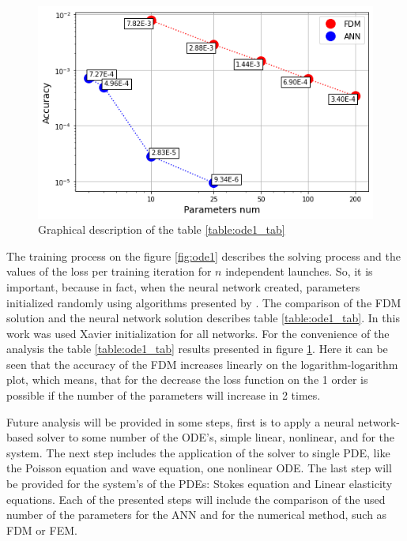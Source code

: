 \begin{figure}
	\centering
	\includegraphics[width=\textwidth]{images/chapter2/fdm_ann_ode_1.png}
	\caption{Graphical description of the table \ref{table:ode1_tab}}
	\label{fig:fdm_ann_ode1}
\end{figure}

The training process on the figure \ref{fig:ode1} describes the solving process and the values of the loss per training iteration for $n$ independent launches. So, it is important, because in fact, when the neural network created, parameters initialized randomly using algorithms presented by \cite{glorot2010understanding} \cite{he2015delving} \cite{saxe2013exact}. 
The comparison of the FDM solution and the neural network solution describes table \ref{table:ode1_tab}. In this work was used Xavier initialization for all networks. For the convenience of the analysis the table \ref{table:ode1_tab} results presented in figure \ref{fig:fdm_ann_ode1}. Here it can be seen that the accuracy of the FDM increases linearly on the logarithm-logarithm plot, which means, that for the decrease the loss function on the 1 order is possible if the number of the parameters will increase in 2 times.

Future analysis will be provided in some steps, first is to apply a neural network-based solver to some number of the ODE's, simple linear, nonlinear, and for the system. The next step includes the application of the solver to single PDE, like the Poisson equation and wave equation, one nonlinear ODE. The last step will be provided for the system's of the PDEs: Stokes equation and Linear elasticity equations. Each of the presented steps will include the comparison of the used number of the parameters for the ANN and for the numerical method, such as FDM or FEM.

